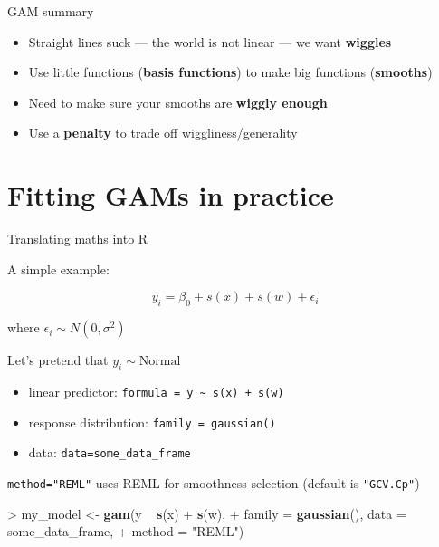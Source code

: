 \documentclass[10pt,ignorenonframetext,compress, aspectratio=169]{beamer}
\newenvironment{Shaded}{\begin{snugshade}}{\end{snugshade}}
\newcommand{\KeywordTok}[1]{\textcolor[rgb]{0.13,0.29,0.53}{\textbf{{#1}}}}
\newcommand{\DataTypeTok}[1]{\textcolor[rgb]{0.13,0.29,0.53}{{#1}}}
\newcommand{\StringTok}[1]{\textcolor[rgb]{0.31,0.60,0.02}{{#1}}}
\newcommand{\NormalTok}[1]{{#1}}
\providecommand{\tightlist}{%
  \setlength{\itemsep}{0pt}\setlength{\parskip}{0pt}}
\begin{document}
\begin{frame}{GAM summary}

\begin{itemize}
\tightlist
\item
  Straight lines suck --- the world is not linear --- we want
  \textbf{wiggles}
\item
  Use little functions (\textbf{basis functions}) to make big functions
  (\textbf{smooths})
\item
  Need to make sure your smooths are \textbf{wiggly enough}
\item
  Use a \textbf{penalty} to trade off wiggliness/generality
\end{itemize}

\end{frame}

\section{Fitting GAMs in practice}\label{fitting-gams-in-practice}

\begin{frame}[fragile]{Translating maths into R}

A simple example:

\[
y_i = \beta_0 + s(x) + s(w) + \epsilon_i
\]

where \(\epsilon_i \sim N(0, \sigma^2)\)

Let's pretend that \(y_i \sim \text{Normal}\)

\begin{itemize}
\tightlist
\item
  linear predictor:
  \texttt{formula\ =\ y\ \textasciitilde{}\ s(x)\ +\ s(w)}
\item
  response distribution: \texttt{family\ =\ gaussian()}
\item
  data: \texttt{data=some\_data\_frame}
\end{itemize}

\texttt{method="REML"} uses REML for smoothness selection (default is
\texttt{"GCV.Cp"})

\begin{Shaded}
\begin{Highlighting}[]
\NormalTok{>}\StringTok{ }\NormalTok{my_model <-}\StringTok{ }\KeywordTok{gam}\NormalTok{(y ~}\StringTok{ }\KeywordTok{s}\NormalTok{(x) +}\StringTok{ }\KeywordTok{s}\NormalTok{(w),}
\NormalTok{+}\StringTok{                 }\DataTypeTok{family =} \KeywordTok{gaussian}\NormalTok{(), }\DataTypeTok{data =} \NormalTok{some_data_frame,}
\NormalTok{+}\StringTok{                 }\DataTypeTok{method =} \StringTok{"REML"}\NormalTok{)}
\end{Highlighting}
\end{Shaded}

\end{frame}
\end{document}

